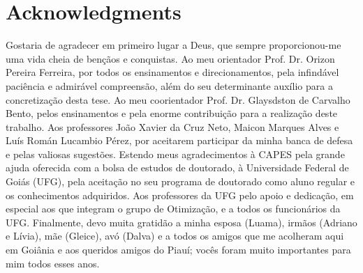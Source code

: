 
\newpage
\chapter*{Acknowledgments}
 Gostaria de agradecer em primeiro lugar a Deus, que sempre proporcionou-me uma vida cheia de ben\c c\~aos e conquistas. Ao meu orientador Prof. Dr. Orizon Pereira Ferreira, por todos os ensinamentos e direcionamentos, pela infind\'avel paci\^encia e admir\'avel compreens\~ao, al\'em do seu determinante aux\'ilio para a concretiza\c c\~ao desta tese. Ao meu coorientador Prof. Dr. Glaysdston de Carvalho Bento, pelos ensinamentos e pela enorme contribui\c c\~ao para a realiza\c{c}\~ao deste trabalho. Aos professores Jo\~ao Xavier da Cruz Neto, Maicon Marques Alves e Lu\'is Rom\'an Lucambio P\'erez, por aceitarem participar da minha banca de defesa e pelas valiosas sugest\~oes. Estendo meus agradecimentos \`a CAPES pela grande ajuda oferecida com a bolsa de estudos de doutorado, \`a Universidade Federal de Goi\'as (UFG), pela aceita\c{c}\~ao no seu programa de doutorado como aluno regular e os conhecimentos adquiridos. Aos professores da UFG pelo apoio e dedica\c{c}\~ao, em especial aos que integram o grupo de Otimiza\c{c}\~ao, e a todos os funcion\'arios da UFG. Finalmente, devo muita gratid\~ao a minha esposa (Luama), irm\~aos (Adriano e L\'ivia), m\~ae (Gleice), av\'o (Dalva) e a todos os amigos que me acolheram aqui em Goi\^ania e aos queridos amigos do Piau\'i; voc\^es foram muito importantes para mim todos esses anos.

 \medskip

 \noindent
\newpage